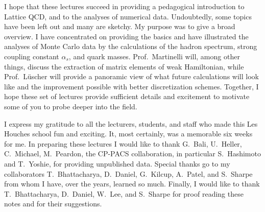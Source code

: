 I hope that these lectures succeed in providing a pedagogical introduction to Lattice QCD, and to the analyses of numerical data. Undoubtedly, some topics have been left out and many are sketchy. My purpose was to give a broad overview. I have concentrated on providing the basics and have illustrated the analyses of Monte Carlo data by the calculations of the hadron spectrum, strong coupling constant $\alpha_s$, and quark masses. Prof.~Martinelli will, among other things, discuss the extraction of matrix elements of weak Hamiltonian, while Prof.~L\"uscher will provide a panoramic view of what future calculations will look like and the improvement possible with better discretization schemes. Together, I hope these set of lectures provide sufficient details and excitement to motivate some of you to probe deeper into the field.

I express my gratitude to all the lecturers, students, and staff who made this Les Houches school fun and exciting. It, most certainly, was a memorable six weeks for me. In preparing these lectures I would like to thank G.~Bali, U.~Heller, C.~Michael, M.~Peardon, the CP-PACS collaboration, in particular S.~Hashimoto and T.~Yoshie, for providing unpublished data. Special thanks go to my collaborators T.~Bhattacharya, D.~Daniel, G.~Kilcup, A.~Patel, and S.~Sharpe from whom I have, over the years, learned so much. Finally, I would like to thank T.~Bhattacharya, D.~Daniel, W.~Lee, and S.~Sharpe for proof reading these notes and for their suggestions.

